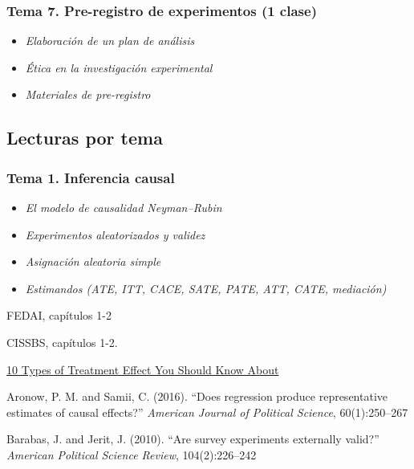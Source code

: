 \documentclass[
  12pt,
]{article}
\providecommand{\tightlist}{%
  \setlength{\itemsep}{0pt}\setlength{\parskip}{0pt}}
\begin{document}
\hypertarget{tema-7.-pre-registro-de-experimentos-1-clase}{%
\subsubsection{Tema 7. Pre-registro de experimentos (1
clase)}\label{tema-7.-pre-registro-de-experimentos-1-clase}}

\begin{itemize}
\tightlist
\item
  \emph{Elaboración de un plan de análisis}
\item
  \emph{Ética en la investigación experimental}
\item
  \emph{Materiales de pre-registro}
\end{itemize}

\hypertarget{lecturas-por-tema}{%
\subsection{Lecturas por tema}\label{lecturas-por-tema}}

\hypertarget{tema-1.-inferencia-causal}{%
\subsubsection{Tema 1. Inferencia
causal}\label{tema-1.-inferencia-causal}}

\begin{itemize}
\tightlist
\item
  \emph{El modelo de causalidad Neyman--Rubin}
\item
  \emph{Experimentos aleatorizados y validez}
\item
  \emph{Asignación aleatoria simple}
\item
  \emph{Estimandos (ATE, ITT, CACE, SATE, PATE, ATT, CATE, mediación)}
\end{itemize}

FEDAI, capítulos 1-2

CISSBS, capítulos 1-2.

\href{https://egap.org/resource/10-types-of-treatment-effect-you-should-know-about/}{10
Types of Treatment Effect You Should Know About}

Aronow, P. M. and Samii, C. (2016). ``Does regression produce
representative estimates of causal effects?'' \emph{American Journal of
Political Science}, 60(1):250--267

Barabas, J. and Jerit, J. (2010). ``Are survey experiments externally
valid?'' \emph{American Political Science Review}, 104(2):226--242
\end{document}
